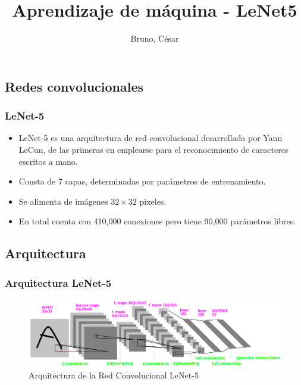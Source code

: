 \documentclass[xcolor=dvipsnames, compress]{beamer}
\title[LeNet]{Aprendizaje de máquina - LeNet5}
\author{Bruno, César}
\institute[ITAM]
\begin{document}
%
\begin{frame}
\titlepage
\end{frame}


\begin{frame}
\section{Redes convolucionales}
\frametitle{LeNet-5}

\begin{itemize}
	\item LeNet-5 es una arquitectura de red convolucional desarrollada por Yann  LeCun, de las primeras en emplearse para el reconocimiento de caracteres escritos a mano.
	
	\item Consta de 7 capas, determinadas por parámetros de entrenamiento.
	
	\item Se alimenta de imágenes $32 \times 32$ pixeles.
	
	\item En total cuenta con 410,000 conexiones pero tiene 90,000 parámetros libres.
\end{itemize}





\end{frame}

\begin{frame}
\section{Arquitectura}
\frametitle{Arquitectura LeNet-5}

	\begin{figure}
		\includegraphics[scale=0.27]{images/lenet5_arch.png}
		\caption{Arquitectura de la Red Convolucional LeNet-5}
	 \end{figure}
\end{frame}
\end{document}
